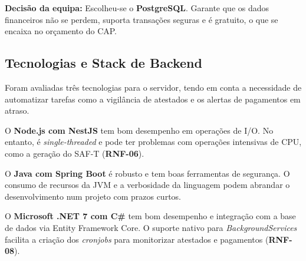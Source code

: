 \textbf{Decisão da equipa:} Escolheu-se o \textbf{PostgreSQL}. Garante que os dados financeiros não se perdem, suporta transações seguras e é gratuito, o que se encaixa no orçamento do CAP.

\subsection{Tecnologias e Stack de Backend}

Foram avaliadas três tecnologias para o servidor, tendo em conta a necessidade de automatizar tarefas como a vigilância de atestados e os alertas de pagamentos em atraso.

O \textbf{Node.js com NestJS} tem bom desempenho em operações de I/O. No entanto, é \textit{single-threaded} e pode ter problemas com operações intensivas de CPU, como a geração do SAF-T (\textbf{RNF-06}).

O \textbf{Java com Spring Boot} é robusto e tem boas ferramentas de segurança. O consumo de recursos da JVM e a verbosidade da linguagem podem abrandar o desenvolvimento num projeto com prazos curtos.

O \textbf{Microsoft .NET 7 com C\#} tem bom desempenho e integração com a base de dados via Entity Framework Core. O suporte nativo para \textit{BackgroundServices} facilita a criação dos \textit{cronjobs} para monitorizar atestados e pagamentos (\textbf{RNF-08}).

